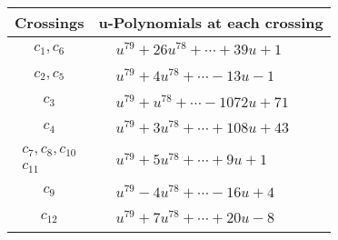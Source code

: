 \documentclass[1p]{elsarticle_modified}
\theoremstyle{definition}
\begin{document}
\begin{tabular}{m{50pt}|m{274pt}}
Crossings & \hspace{64pt}u-Polynomials at each crossing \\
\hline $$\begin{aligned}c_{1},c_{6}\end{aligned}$$&$\begin{aligned}
&u^{79}+26 u^{78}+\cdots+39 u+1
\end{aligned}$\\
\hline $$\begin{aligned}c_{2},c_{5}\end{aligned}$$&$\begin{aligned}
&u^{79}+4 u^{78}+\cdots-13 u-1
\end{aligned}$\\
\hline $$\begin{aligned}c_{3}\end{aligned}$$&$\begin{aligned}
&u^{79}+u^{78}+\cdots-1072 u+71
\end{aligned}$\\
\hline $$\begin{aligned}c_{4}\end{aligned}$$&$\begin{aligned}
&u^{79}+3 u^{78}+\cdots+108 u+43
\end{aligned}$\\
\hline $$\begin{aligned}c_{7},c_{8},c_{10}\\c_{11}\end{aligned}$$&$\begin{aligned}
&u^{79}+5 u^{78}+\cdots+9 u+1
\end{aligned}$\\
\hline $$\begin{aligned}c_{9}\end{aligned}$$&$\begin{aligned}
&u^{79}-4 u^{78}+\cdots-16 u+4
\end{aligned}$\\
\hline $$\begin{aligned}c_{12}\end{aligned}$$&$\begin{aligned}
&u^{79}+7 u^{78}+\cdots+20 u-8
\end{aligned}$\\
\hline
\end{tabular}\\~\\
\end{document}
